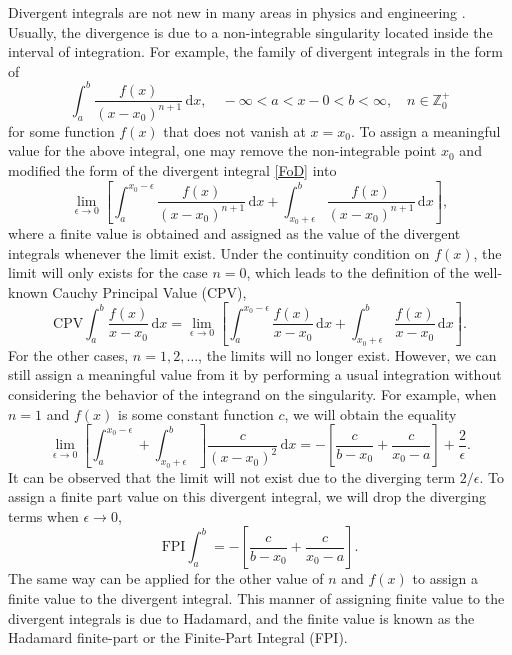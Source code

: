 Divergent integrals are not new in many areas in physics and engineering \cite{bonnet1999boundary, frankel2006generalizing, frankel2007regularization}. Usually, the divergence is due to a non-integrable singularity located inside the interval of integration. For example, the family of divergent integrals in the form of
\begin{equation} \label{FoD}
    \int_{a}^{b} \frac{f(x)}{(x-x_0)^{n+1}} \, \mathrm{d}x, \quad -\infty < a < x-0 < b < \infty, \quad n \in \mathbb{Z}_0^{+}
\end{equation}
for some function $f(x)$ that does not vanish at $x=x_0$. To assign a meaningful value for the above integral, one may remove the non-integrable point $x_0$ and modified the form of the divergent integral \eqref{FoD} into 
\begin{equation}
    \lim_{\epsilon \to 0} \left[ \int_{a}^{x_0 - \epsilon} \frac{f(x)}{(x-x_0)^{n+1}} \, \mathrm{d}x + \int_{x_0 + \epsilon}^{b} \frac{f(x)}{(x-x_0)^{n+1}} \, \mathrm{d}x \right],
\end{equation}
where a finite value is obtained and assigned as the value of the divergent integrals whenever the limit exist. Under the continuity condition on $f(x)$, the limit will only exists for the case $n=0$, which leads to the definition of the well-known Cauchy Principal Value (CPV),
\begin{equation}
    \mathrm{CPV}\int_{a}^{b} \frac{f(x)}{x-x_0} \, \mathrm{d}x = \lim_{\epsilon \to 0} \left[ \int_{a}^{x_0 - \epsilon} \frac{f(x)}{x-x_0} \, \mathrm{d}x + \int_{x_0 + \epsilon}^{b} \frac{f(x)}{x-x_0} \, \mathrm{d}x \right].
\end{equation}
For the other cases, $n=1,2, \dots$, the limits will no longer exist. However, we can still assign a meaningful value from it by performing a usual integration without considering the behavior of the integrand on the singularity. For example, when $n=1$ and $f(x)$ is some constant function $c$, we will obtain the equality
\begin{equation}
    \lim_{\epsilon \to 0} \left[ \int_{a}^{x_0-\epsilon} + \int_{x_0+\epsilon}^{b} \right] \frac{c}{(x-x_0)^{2}} \, \mathrm{d}x = - \left[ \frac{c}{b-x_0} + \frac{c}{x_0-a} \right] + \frac{2}{\epsilon}.
\end{equation}
It can be observed that the limit will not exist due to the diverging term $2/\epsilon$. To assign a finite part value on this divergent integral, we will drop the diverging terms when $\epsilon \to 0$,
\begin{equation}
    \mathrm{FPI} \int_{a}^{b} =  - \left[ \frac{c}{b-x_0} + \frac{c}{x_0-a} \right].
\end{equation}
The same way can be applied for the other value of $n$ and $f(x)$ to assign a finite value to the divergent integral. This manner of assigning finite value to the divergent integrals is due to Hadamard, and the finite value is known as the Hadamard finite-part or the Finite-Part Integral (FPI).

